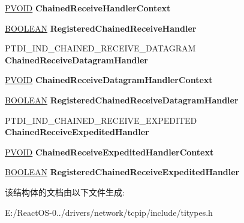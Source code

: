 \begin{DoxyCompactItemize}
\item 
\mbox{\label{struct___a_d_d_r_e_s_s___f_i_l_e_a20f77d63854f427e95c81a6813c902b4}} 
\hyperlink{interfacevoid}{P\+V\+O\+ID} {\bfseries Chained\+Receive\+Handler\+Context}
\item 
\mbox{\label{struct___a_d_d_r_e_s_s___f_i_l_e_a687382ca80794ea3753bc0a66ab4a465}} 
\hyperlink{_processor_bind_8h_a112e3146cb38b6ee95e64d85842e380a}{B\+O\+O\+L\+E\+AN} {\bfseries Registered\+Chained\+Receive\+Handler}
\item 
\mbox{\label{struct___a_d_d_r_e_s_s___f_i_l_e_a471b02747305aebac14bedb09516ad7b}} 
P\+T\+D\+I\+\_\+\+I\+N\+D\+\_\+\+C\+H\+A\+I\+N\+E\+D\+\_\+\+R\+E\+C\+E\+I\+V\+E\+\_\+\+D\+A\+T\+A\+G\+R\+AM {\bfseries Chained\+Receive\+Datagram\+Handler}
\item 
\mbox{\label{struct___a_d_d_r_e_s_s___f_i_l_e_a92cd7257ddf03291be1a88c506e3942f}} 
\hyperlink{interfacevoid}{P\+V\+O\+ID} {\bfseries Chained\+Receive\+Datagram\+Handler\+Context}
\item 
\mbox{\label{struct___a_d_d_r_e_s_s___f_i_l_e_add8f02735b43c7a69c0f63ce4e13b2ee}} 
\hyperlink{_processor_bind_8h_a112e3146cb38b6ee95e64d85842e380a}{B\+O\+O\+L\+E\+AN} {\bfseries Registered\+Chained\+Receive\+Datagram\+Handler}
\item 
\mbox{\label{struct___a_d_d_r_e_s_s___f_i_l_e_acf3e52676fbf45e6622b4e8d028e9c63}} 
P\+T\+D\+I\+\_\+\+I\+N\+D\+\_\+\+C\+H\+A\+I\+N\+E\+D\+\_\+\+R\+E\+C\+E\+I\+V\+E\+\_\+\+E\+X\+P\+E\+D\+I\+T\+ED {\bfseries Chained\+Receive\+Expedited\+Handler}
\item 
\mbox{\label{struct___a_d_d_r_e_s_s___f_i_l_e_ae368fcad8e1139dfaf4de0c42a76ecc9}} 
\hyperlink{interfacevoid}{P\+V\+O\+ID} {\bfseries Chained\+Receive\+Expedited\+Handler\+Context}
\item 
\mbox{\label{struct___a_d_d_r_e_s_s___f_i_l_e_a2ca252505655f097fb8a199afde4ecf8}} 
\hyperlink{_processor_bind_8h_a112e3146cb38b6ee95e64d85842e380a}{B\+O\+O\+L\+E\+AN} {\bfseries Registered\+Chained\+Receive\+Expedited\+Handler}
\end{DoxyCompactItemize}


该结构体的文档由以下文件生成\+:\begin{DoxyCompactItemize}
\item 
E\+:/\+React\+O\+S-\/0../drivers/network/tcpip/include/titypes.\+h\end{DoxyCompactItemize}
